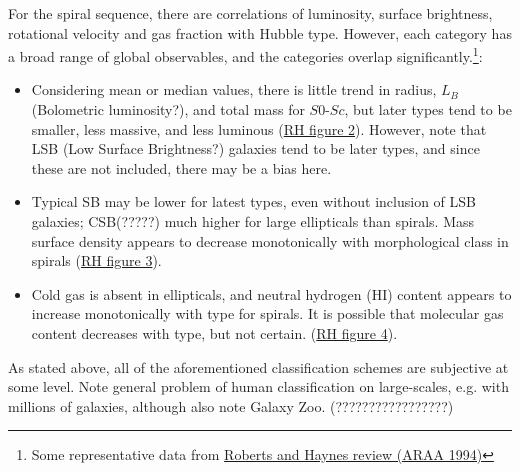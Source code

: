 \documentclass{article}
\newcommand{\mynotes}[1]{\textcolor{cadmiumgreen}{#1}}
\begin{document}
For the spiral sequence, there are correlations of luminosity, surface
brightness, rotational velocity and gas fraction with Hubble type. However,
each category has a broad range of global observables, and the categories overlap
significantly.\footnote{Some representative data from
\href{http://adsabs.harvard.edu/cgi-bin/nph-bib_query?bibcode=1994ARA\%26A..32..115}
{Roberts and Haynes review (ARAA 1994)}}:
\begin{itemize}
    \item Considering mean or median values, there is little trend in radius,
        $L_{B}$ \mynotes{(Bolometric luminosity?)}, and total mass for
        $S0$-$Sc$, but later types tend to be smaller, less massive, and less
        luminous
        (\href{http://astronomy.nmsu.edu/holtz/a555/html/diagrams/a616/rh2.htm}
        {{RH figure 2}}).
        However, note that LSB \mynotes{(Low Surface Brightness?)} galaxies
        tend to be later types, and since these are not included, there may be
        a bias here.
    \item Typical SB may be lower for latest types, even without inclusion of
        LSB galaxies; CSB\mynotes{(?????)} much higher for large ellipticals
        than spirals. Mass surface density appears to decrease monotonically
        with morphological class in spirals
        (\href{http://astronomy.nmsu.edu/holtz/a555/html/diagrams/a616/rh3.htm}
        {{RH figure 3}}).
    \item Cold gas is absent in ellipticals, and neutral hydrogen (HI) content
        appears to increase monotonically with type for spirals. It is possible
        that molecular gas content decreases with type, but not certain.
        (\href{http://astronomy.nmsu.edu/holtz/a555/html/diagrams/a616/rh4.htm}
        {{RH figure 4}}).
\end{itemize}
As stated above, all of the aforementioned classification schemes are
subjective at some level. Note general problem of human classification on
large-scales, e.g. with millions of galaxies, although also note Galaxy Zoo.
\mynotes{(?????????????????)}
\end{document}
